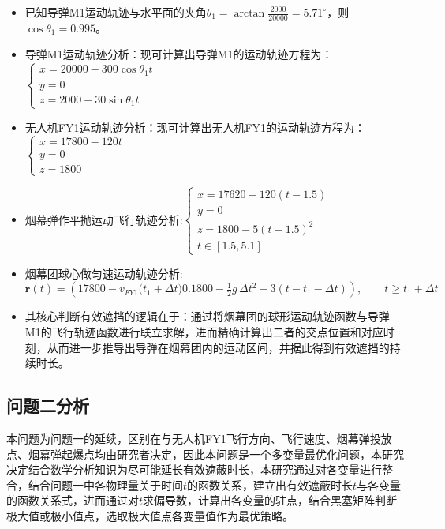 \documentclass{article}
\begin{document}
\begin{itemize}
    \item 已知导弹M1运动轨迹与水平面的夹角$\theta_1 = \arctan{\frac{2000}{20000}} = 5.71^\circ$，则$\cos\theta_1 = 0.995$。
    \item 导弹M1运动轨迹分析：现可计算出导弹M1的运动轨迹方程为：$\begin{cases}
        x = 20000 - 300 \cos\theta_1 t \\
        y = 0 \\
        z = 2000 - 30 \sin \theta_1t
    \end{cases}$
    \item 无人机FY1运动轨迹分析：现可计算出无人机FY1的运动轨迹方程为：$\begin{cases}
        x = 17800 - 120t \\
        y = 0 \\
        z = 1800 
    \end{cases}$
    \item 烟幕弹作平抛运动飞行轨迹分析:$\begin{cases}
        x = 17620 - 120(t - 1.5) \\
        y = 0 \\
        z = 1800  - 5(t - 1.5)^2 \\
        t \in [1.5,5.1]
    \end{cases}$
    \item 烟幕团球心做匀速运动轨迹分析:\[
\mathbf{r}(t)=\left(
17800 - v_{FY1}\big(t_1+ \Delta t)
0.1800 - \tfrac{1}{2}g\,\Delta t^{2} - 3(t - t_1 - \Delta t)
\right),
\qquad t \ge t_1 + \Delta t
\]
    \item 其核心判断有效遮挡的逻辑在于：通过将烟幕团的球形运动轨迹函数与导弹M1的飞行轨迹函数进行联立求解，进而精确计算出二者的交点位置和对应时刻，从而进一步推导出导弹在烟幕团内的运动区间，并据此得到有效遮挡的持续时长。
\end{itemize}

\subsection{问题二分析}
本问题为问题一的延续，区别在与无人机FY1飞行方向、飞行速度、烟幕弹投放点、烟幕弹起爆点均由研究者决定，因此本问题是一个多变量最优化问题，本研究决定结合数学分析知识为尽可能延长有效遮蔽时长，本研究通过对各变量进行整合，结合问题一中各物理量关于时间$t$的函数关系，建立出有效遮蔽时长$t$与各变量的函数关系式，进而通过对$t$求偏导数，计算出各变量的驻点，结合黑塞矩阵判断极大值或极小值点，选取极大值点各变量值作为最优策略。
\end{document}
